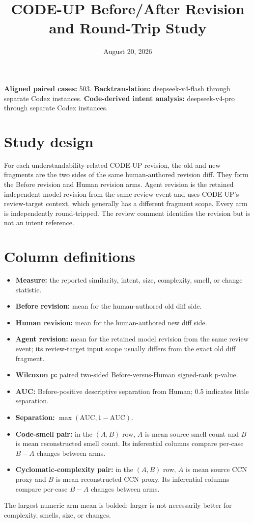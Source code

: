 \documentclass[11pt]{article}
\title{CODE-UP Before/After Revision and Round-Trip Study}
\date{August 20, 2026}
\begin{document}
\maketitle

\textbf{Aligned paired cases:} 503. \textbf{Backtranslation:} deepseek-v4-flash through separate Codex instances. \textbf{Code-derived intent analysis:} deepseek-v4-pro through separate Codex instances.

\section*{Study design}
For each understandability-related CODE-UP revision, the old and new fragments are the two sides of the same human-authored revision diff. They form the Before revision and Human revision arms. Agent revision is the retained independent model revision from the same review event and uses CODE-UP's review-target context, which generally has a different fragment scope. Every arm is independently round-tripped. The review comment identifies the revision but is not an intent reference.

\section*{Column definitions}
\begin{itemize}
\item \textbf{Measure:} the reported similarity, intent, size, complexity, smell, or change statistic.
\item \textbf{Before revision:} mean for the human-authored old diff side.
\item \textbf{Human revision:} mean for the human-authored new diff side.
\item \textbf{Agent revision:} mean for the retained model revision from the same review event; its review-target input scope usually differs from the exact old diff fragment.
\item \textbf{Wilcoxon p:} paired two-sided Before-versus-Human signed-rank p-value.
\item \textbf{AUC:} Before-positive descriptive separation from Human; 0.5 indicates little separation.
\item \textbf{Separation:} $\max(\mathrm{AUC},1-\mathrm{AUC})$.
\item \textbf{Code-smell pair:} in the $(A,B)$ row, $A$ is mean source smell count and $B$ is mean reconstructed smell count. Its inferential columns compare per-case $B-A$ changes between arms.
\item \textbf{Cyclomatic-complexity pair:} in the $(A,B)$ row, $A$ is mean source CCN proxy and $B$ is mean reconstructed CCN proxy. Its inferential columns compare per-case $B-A$ changes between arms.
\end{itemize}
The largest numeric arm mean is bolded; larger is not necessarily better for complexity, smells, size, or changes.
\end{document}
